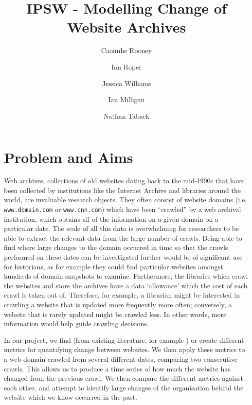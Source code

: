 \documentclass[10pt, a4paper]{article}
\begin{document}
\title{IPSW - Modelling Change of Website Archives}
\author[1]{Caoimhe Rooney}
\author[1]{Ian Roper}
\author[1]{Jessica Williams}
\author[2]{Ian Milligan}
\author[3]{Nathan Taback}
\date{}
\maketitle

\vspace{-12mm}

\section{Problem and Aims}

\vspace{-2mm}

 Web archives, collections of old websites dating back to the mid-1990s that have been collected by institutions like the Internet Archive and libraries around the world, are invaluable research objects.
 They often consist of website domains (i.e. \texttt{www.domain.com} or \texttt{www.cnn.com}) which have been ``crawled'' by a web archival institution, which obtains all of the information on a given domain on a particular date.
 The scale of all this data is overwhelming for researchers to be able to extract the relevant data from the large number of crawls.
 Being able to find where large changes to the domain occurred in time so that the crawls performed on these dates can be investigated further would be of significant use for historians, as for example they could find particular websites amongst hundreds of domain snapshots to examine.
 Furthermore, the libraries which crawl the websites and store the archives have a data `allowance' which the cost of each crawl is taken out of.
 Therefore, for example, a librarian might be interested in crawling a website that is updated more frequently more often; conversely, a website that is rarely updated might be crawled less.
 In other words, more information would help guide crawling decisions. 
 
 In our project, we find (from existing literature, for example \cite{dhyani2002survey}) or create different metrics for quantifying change between websites.
 We then apply these metrics to a web domain crawled from several different dates, comparing two consecutive crawls.
 This allows us to produce a time series of how much the website has changed from the previous crawl.
 We then compare the different metrics against each other, and attempt to identify large changes of the organisation behind the website which we know occurred in the past.
\vspace{-3mm}
\end{document}
